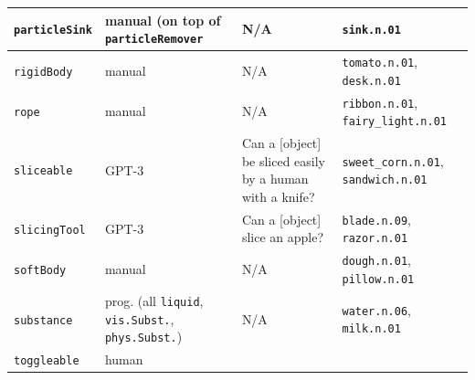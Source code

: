 {\begin{longtable}{|l|p{}|p{}|p{}|}
        \texttt{particleSink} & 
            manual (on top of \texttt{particleRemover} &
            N/A &
             \texttt{sink.n.01}
        \\\hline
        \texttt{rigidBody} & 
            manual &
            N/A & 
             \texttt{tomato.n.01}, \texttt{desk.n.01} 
        \\\hline
        \texttt{rope} & 
            manual &
            N/A & 
             \texttt{ribbon.n.01}, \texttt{fairy\_light.n.01} 
        \\\hline
        \texttt{sliceable} & 
            GPT-3 &
            Can a [object] be sliced easily by a human with a knife? &
             \texttt{sweet\_corn.n.01}, \mbox{\texttt{sandwich.n.01}} 
        \\\hline
        \texttt{slicingTool} & 
            GPT-3 &
            Can a [object] slice an apple? & 
             \texttt{blade.n.09}, \texttt{razor.n.01}
        \\\hline
        \texttt{softBody} & 
            manual &
            N/A & 
             \texttt{dough.n.01}, \texttt{pillow.n.01} 
        \\\hline
        \texttt{substance} & 
             prog. (all \texttt{liquid}, \texttt{vis.Subst.}, \texttt{phys.Subst.}) &
            N/A & 
             \texttt{water.n.06}, \texttt{milk.n.01} 
        \\\hline
        \texttt{toggleable} & 
            human &

\end{longtable}}
